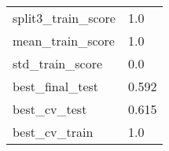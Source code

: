 \begin{tabular}{ll}
split3\_train\_score      &                                                1.0 \\
mean\_train\_score        &                                                1.0 \\
std\_train\_score         &                                                0.0 \\
best\_final\_test         &                                              0.592 \\
best\_cv\_test            &                                              0.615 \\
best\_cv\_train           &                                                1.0 \\
\bottomrule
\end{tabular}
